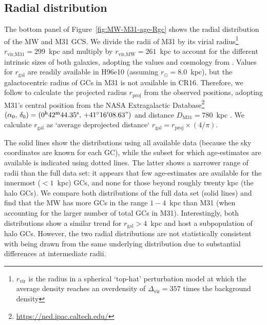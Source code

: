 \documentclass[a4paper,fleqn,usenatbib]{mnras}
\begin{document}
\subsection{Radial distribution}
\label{sec:Rgc}
The bottom panel of Figure~\ref{fig:MW-M31-age-Rgc} shows the radial distribution
of the MW and M31 GCS. We divide the radii of M31 by its virial radius\footnote{
$r_{\text{vir}}$ is the radius in a spherical `top-hat' perturbation model at which
the average density reaches an overdensity of $\Delta_{\text{vir}}=357$ times the 
background density} $r_{\text{vir,M31}} = 299$~kpc and multiply by 
$r_{\text{vir,MW}} = 261$~kpc to account for the different intrinsic sizes of both 
galaxies, adopting the values and cosmology from \citet{2017MNRAS.464.3825P}.
Values for $r_{\text{gal}}$ are readily available in H96e10 (assuming $r_{\odot}=8.0$~kpc), 
but the galactocentric radius of GCs in M31 is not available in CR16. Therefore, we 
follow \citet[][section~4.1]{2019arXiv190111229W} 
to calculate the projected radius $r_{\text{proj}}$ from the observed positions,
adopting M31's central position from the NASA Extragalactic 
Database\footnote{\url{https://ned.ipac.caltech.edu/}} $(\alpha_0, \, \delta_0) =
(0^{\text{h}}42^{\text{m}}44.35^{\text{s}}, \, +41^{\circ}16'08.63")$
and distance $D_{\text{M31}} = 780$~kpc \citep{2005MNRAS.356..979M,2012ApJ...758...11C}.
We calculate $r_{\text{gal}}$ as `average deprojected distance`
$r_{\text{gal}} = r_{\text{proj}} \times (4/\pi)$. 

The solid lines show the distributions using all available data (because the
sky coordinates are known for each GC), while the subset for which age-estimates
are available is indicated using dotted lines. The latter shows a narrower range
of radii than the full data set: it appears that few age-estimates are available 
for the innermost ($<1$~kpc) GCs, and none for those beyond roughly twenty
kpc (the halo GCs). We compare both distributions of the full data set (solid 
lines) and find that the MW has more GCs in the range $1-4$~kpc than M31
(when accounting for the larger number of total GCs in M31). Interestingly, both
distributions show a similar trend for $r_{\text{gal}} > 4$~kpc and host a 
subpopulation of halo GCs. However, the two radial distributions are not statistically
consistent with being drawn from the same underlying distribution due to substantial 
differences at intermediate radii.
\end{document}
